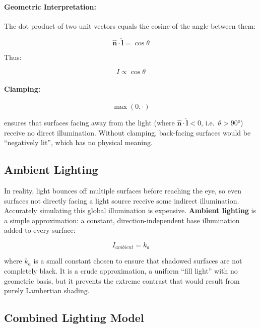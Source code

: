 \documentclass[11pt]{article}
\begin{document}
\paragraph{Geometric Interpretation:}

The dot product of two unit vectors equals the cosine of the angle between them:

\begin{equation}
    \hat{\mathbf{n}} \cdot \hat{\mathbf{l}} = \cos\theta
\end{equation}

Thus:

\begin{equation}
    I \propto \cos\theta
\end{equation}

\paragraph{Clamping:}

\begin{equation}
    \max(0, \cdot)
\end{equation}

ensures that surfaces facing away from the light (where $\hat{\mathbf{n}} \cdot \hat{\mathbf{l}} < 0$, i.e.\ $\theta > 90°$) receive no direct illumination. Without clamping, back-facing surfaces would be ``negatively lit'', which has no physical meaning.


\subsection{Ambient Lighting}

In reality, light bounces off multiple surfaces before reaching the eye, so even surfaces not directly facing a light source receive some indirect illumination. Accurately simulating this global illumination is expensive. \textbf{Ambient lighting} is a simple approximation: a constant, direction-independent base illumination added to every surface:

\begin{equation}
    I_{ambient} = k_a
\end{equation}

where $k_a$ is a small constant chosen to ensure that shadowed surfaces are not completely black. It is a crude approximation, a uniform ``fill light'' with no geometric basis, but it prevents the extreme contrast that would result from purely Lambertian shading.


\subsection{Combined Lighting Model}
\end{document}
